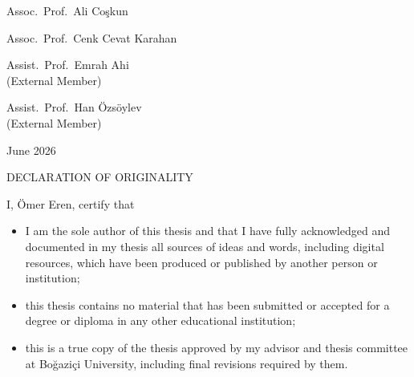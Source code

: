 \documentclass[12pt, oneside]{report}
\begin{document}
\vspace{0.5in}

\begin{singlespace}
\noindent Assoc.\ Prof.\ Ali Coşkun \hfill \underline{\hspace{3in}}
\end{singlespace}

\vspace{0.5in}

\begin{singlespace}
\noindent Assoc.\ Prof.\ Cenk Cevat Karahan \hfill \underline{\hspace{3in}}
\end{singlespace}

\vspace{0.5in}

\begin{singlespace}
\noindent Assist.\ Prof.\ Emrah Ahi \hfill \underline{\hspace{3in}}\\
\noindent (External Member)
\end{singlespace}

\vspace{0.5in}

\begin{singlespace}
\noindent Assist.\ Prof.\ Han Özsöylev \hfill \underline{\hspace{3in}}\\
\noindent (External Member)
\end{singlespace}

\vspace{0.5in}

\begin{center}
June 2026
\end{center}

\clearpage

\thispagestyle{empty}
\begin{center}
DECLARATION OF ORIGINALITY
\end{center}

\noindent I, Ömer Eren, certify that

\begin{itemize}
  \renewcommand\labelitemi{--}
  \item I am the sole author of this thesis and that I have fully acknowledged
        and documented in my thesis all sources of ideas and words, including
        digital resources, which have been produced or published by another
        person or institution;
  \item this thesis contains no material that has been submitted or accepted
        for a degree or diploma in any other educational institution;
  \item this is a true copy of the thesis approved by my advisor and thesis
        committee at Boğaziçi University, including final revisions required
        by them.
\end{itemize}
\end{document}
